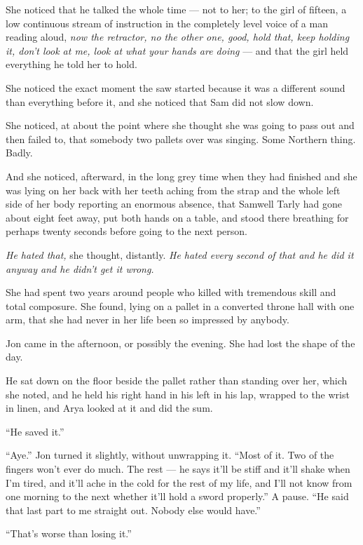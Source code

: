 She noticed that he talked the whole time — not to her; to the girl of fifteen, a low continuous stream of instruction in the completely level voice of a man reading aloud, \textit{now the retractor, no the other one, good, hold that, keep holding it, don’t look at me, look at what your hands are doing} — and that the girl held everything he told her to hold.

She noticed the exact moment the saw started because it was a different sound than everything before it, and she noticed that Sam did not slow down.

She noticed, at about the point where she thought she was going to pass out and then failed to, that somebody two pallets over was singing. Some Northern thing. Badly.

And she noticed, afterward, in the long grey time when they had finished and she was lying on her back with her teeth aching from the strap and the whole left side of her body reporting an enormous absence, that Samwell Tarly had gone about eight feet away, put both hands on a table, and stood there breathing for perhaps twenty seconds before going to the next person.

\textit{He hated that,} she thought, distantly. \textit{He hated every second of that and he did it anyway and he didn’t get it wrong.}

She had spent two years around people who killed with tremendous skill and total composure. She found, lying on a pallet in a converted throne hall with one arm, that she had never in her life been so impressed by anybody.

\sceneBreak

Jon came in the afternoon, or possibly the evening. She had lost the shape of the day.

He sat down on the floor beside the pallet rather than standing over her, which she noted, and he held his right hand in his left in his lap, wrapped to the wrist in linen, and Arya looked at it and did the sum.

“He saved it.”

“Aye.” Jon turned it slightly, without unwrapping it. “Most of it. Two of the fingers won’t ever do much. The rest — he says it’ll be stiff and it’ll shake when I’m tired, and it’ll ache in the cold for the rest of my life, and I’ll not know from one morning to the next whether it’ll hold a sword properly.” A pause. “He said that last part to me straight out. Nobody else would have.”

“That’s worse than losing it.”

